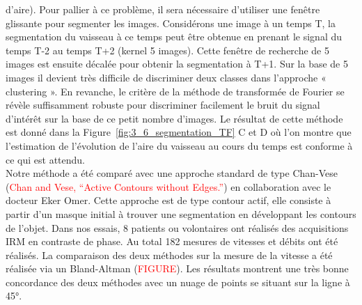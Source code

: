 d’aire). Pour pallier à ce problème, il sera nécessaire d’utiliser une fenêtre glissante pour segmenter
les images. Considérons une image à un temps T, la segmentation du vaisseau à ce temps peut être
obtenue en prenant le signal du temps T-2 au temps T+2 (kernel 5 images). Cette fenêtre de recherche
de 5 images est ensuite décalée pour obtenir la segmentation à T+1. Sur la base de 5 images il devient
très difficile de discriminer deux classes dans l’approche « clustering ». En revanche, le critère de la
méthode de transformée de Fourier se révèle suffisamment robuste pour discriminer facilement le
bruit du signal d’intérêt sur la base de ce petit nombre d’images. Le résultat de cette méthode est
donné dans la Figure~\ref{fig:3_6_segmentation_TF} C et D où l’on montre que l’estimation de l’évolution de l’aire du vaisseau au cours du temps est conforme à ce qui est attendu.\\

Notre méthode a été comparé avec une approche standard de type Chan-Vese (\textcolor{red}{Chan and Vese, “Active Contours without Edges.”}) en collaboration avec le docteur Eker Omer. Cette approche est de type contour actif, elle consiste à partir d'un masque initial à trouver une segmentation en développant les contours de l'objet. Dans nos essais, 8 patients ou volontaires ont réalisés des acquisitions IRM en contraste de phase. Au total 182 mesures de vitesses et débits ont été réalisés. La comparaison des deux méthodes sur la mesure de la vitesse a été réalisée via un Bland-Altman (\textcolor{red}{FIGURE}). Les résultats montrent une très bonne concordance des deux méthodes avec un nuage de points se situant sur la ligne à 45°.
